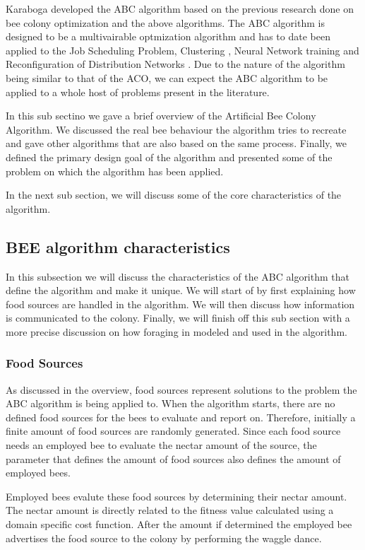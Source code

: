 Karaboga developed the ABC algorithm based on the previous research done on bee colony optimization and the above algorithms. The ABC algorithm is designed to be a multivairable optmization algorithm and has to date been applied to the Job Scheduling Problem, Clustering \cite{HybridABCClustering}, Neural Network training and Reconfiguration of Distribution Networks \cite{ABCReconfigDistro}. Due to the nature of the algorithm being similar to that of the ACO, we can expect the ABC algorithm to be applied to a whole host of problems present in the literature.

In this sub sectino we gave a brief overview of the Artificial Bee Colony Algorithm. We discussed the real bee behaviour the algorithm tries to recreate and  gave other algorithms that are also based on the same process. Finally, we defined the primary design goal of the algorithm and presented some of the problem on which the algorithm has been applied.

In the next sub section, we will discuss some of the core characteristics of the algorithm.
\subsection{BEE algorithm characteristics}
In this subsection we will discuss the characteristics of the ABC algorithm that define the algorithm and make it unique. We will start of by first explaining how food sources are handled in the algorithm. We will then discuss how information is communicated to the colony. Finally, we will finish off this sub section with a more precise discussion on how foraging in modeled and used in the algorithm.
\subsubsection{Food Sources}
As discussed in the overview, food sources represent solutions to the problem the ABC algorithm is being applied to. When the algorithm starts, there are no defined food sources for the bees to evaluate and report on. Therefore, initially a finite amount of food sources are randomly generated. Since each food source needs an employed bee to evaluate the nectar amount of the source, the parameter that defines the amount of food sources also defines the amount of employed bees.

Employed bees evalute these food sources by determining their nectar amount. The nectar amount is directly related to the fitness value calculated using a domain specific cost function. After the amount if determined the employed bee advertises the food source to the colony by performing the waggle dance. 

